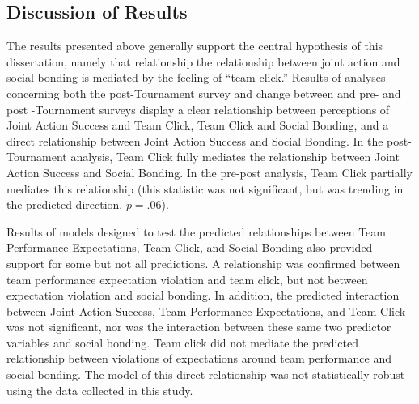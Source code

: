 \begin{landscape}
\section{Discussion of Results}

  The results presented above generally support the central hypothesis of this dissertation, namely that relationship the relationship between joint action and social bonding is mediated by the feeling of ``team click.''  Results of analyses concerning both the post-Tournament survey and change between and pre- and post -Tournament surveys display a clear relationship between perceptions of Joint Action Success and Team Click, Team Click and Social Bonding, and a direct relationship between Joint Action Success and Social Bonding.  In the post-Tournament analysis, Team Click fully mediates the relationship between Joint Action Success and Social Bonding. In the pre-post analysis, Team Click partially mediates this relationship (this statistic was not significant, but was trending in the predicted direction, $p = .06$).

  Results of models designed to test the predicted relationships between Team Performance Expectations, Team Click, and Social Bonding also provided support for some but not all predictions. A relationship was confirmed between team performance expectation violation and team click, but not between expectation violation and social bonding. In addition, the predicted interaction between Joint Action Success, Team Performance Expectations, and Team Click was not significant, nor was the interaction between these same two predictor variables and social bonding.  Team click did not mediate the predicted relationship between violations of expectations around team performance and social bonding. The model of this direct relationship was not statistically robust using the data collected in this study.


\end{landscape}
